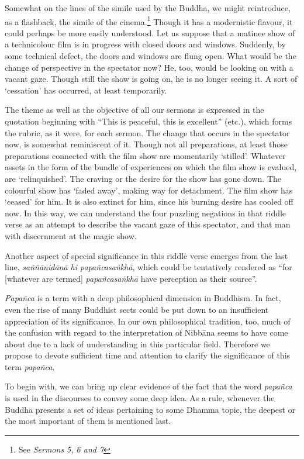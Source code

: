 Somewhat on the lines of the simile used by the Buddha, we might reintroduce, as a flashback, the simile of the cinema.\footnote{See \emph{Sermons 5, 6 and 7}} Though it has a modernistic flavour, it could perhaps be more easily understood. Let us suppose that a matinee show of a technicolour film is in progress with closed doors and windows. Suddenly, by some technical defect, the doors and windows are flung open. What would be the change of perspective in the spectator now? He, too, would be looking on with a vacant gaze. Though still the show is going on, he is no longer seeing it. A sort of `cessation' has occurred, at least temporarily.

The theme as well as the objective of all our sermons is expressed in the quotation beginning with ``This is peaceful, this is excellent'' (etc.), which forms the rubric, as it were, for each sermon. The change that occurs in the spectator now, is somewhat reminiscent of it. Though not all preparations, at least those preparations connected with the film show are momentarily `stilled'. Whatever assets in the form of the bundle of experiences on which the film show is evalued, are `relinquished'. The craving or the desire for the show has gone down. The colourful show has `faded away', making way for detachment. The film show has `ceased' for him. It is also extinct for him, since his burning desire has cooled off now. In this way, we can understand the four puzzling negations in that riddle verse as an attempt to describe the vacant gaze of this spectator, and that man with discernment at the magic show.

Another aspect of special significance in this riddle verse emerges from the last line, \emph{saññānidānā hi papañcasaṅkhā}, which could be tentatively rendered as ``for {[}whatever are termed{]} \emph{papañcasaṅkhā} have perception as their source''.

\emph{Papañca} is a term with a deep philosophical dimension in Buddhism. In fact, even the rise of many Buddhist sects could be put down to an insufficient appreciation of its significance. In our own philosophical tradition, too, much of the confusion with regard to the interpretation of Nibbāna seems to have come about due to a lack of understanding in this particular field. Therefore we propose to devote sufficient time and attention to clarify the significance of this term \emph{papañca}.

To begin with, we can bring up clear evidence of the fact that the word \emph{papañca} is used in the discourses to convey some deep idea. As a rule, whenever the Buddha presents a set of ideas pertaining to some Dhamma topic, the deepest or the most important of them is mentioned last.

